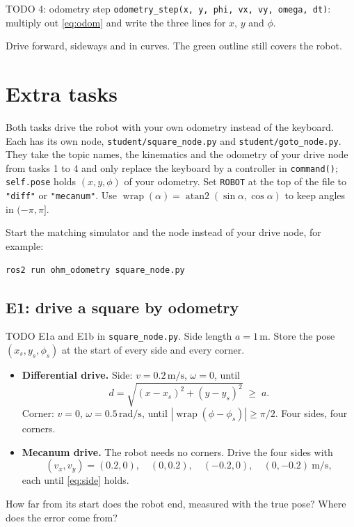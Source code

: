 \documentclass[11pt,a4paper,parskip=half]{scrartcl}
\newcommand{\thema}[1]{\texttt{#1}}
\newcommand{\datei}[1]{\texttt{#1}}
\begin{document}
\begin{todo}{TODO 4: odometry step}
\thema{odometry\_step(x, y, phi, vx, vy, omega, dt)}: multiply out \cref{eq:odom} and write the three
lines for \(x\), \(y\) and \(\phi\).
\end{todo}

\begin{checkpoint}
Drive forward, sideways and in curves. The green outline still covers the robot.
\end{checkpoint}

\newpage
\section{Extra tasks}
\label{sec:extra}
Both tasks drive the robot with your own odometry instead of the keyboard. Each has its own node,
\datei{student/square\_node.py} and \datei{student/goto\_node.py}. They take the topic names, the
kinematics and the odometry of your drive node from tasks 1 to 4 and only replace the keyboard by a controller in \thema{command()};
\thema{self.pose} holds \((x, y, \phi)\) of your odometry. Set \thema{ROBOT} at the top of the file to
\thema{"diff"} or \thema{"mecanum"}. Use \(\operatorname{wrap}(\alpha) = \operatorname{atan2}(\sin\alpha,
\cos\alpha)\) to keep angles in \((-\pi, \pi]\).

Start the matching simulator and the node instead of your drive node, for example:
\begin{lstlisting}
ros2 run ohm_odometry square_node.py
\end{lstlisting}

\subsection*{E1: drive a square by odometry}
TODO E1a and E1b in \datei{square\_node.py}. Side length \(a = 1\,\mathrm{m}\). Store the pose \((x_s, y_s, \phi_s)\) at the start of every side
and every corner.
\begin{itemize}
  \item \textbf{Differential drive.} Side: \(v = 0.2\,\mathrm{m/s}\), \(\omega = 0\), until
        \begin{equation}
          d = \sqrt{(x - x_s)^2 + (y - y_s)^2} \;\ge\; a .
          \label{eq:side}
        \end{equation}
        Corner: \(v = 0\), \(\omega = 0.5\,\mathrm{rad/s}\), until
        \(\left|\operatorname{wrap}(\phi - \phi_s)\right| \ge \pi/2\). Four sides, four corners.
  \item \textbf{Mecanum drive.} The robot needs no corners. Drive the four sides with
        \begin{equation*}
          (v_x, v_y) = (0.2, 0),\quad (0, 0.2),\quad (-0.2, 0),\quad (0, -0.2)\ \mathrm{m/s},
        \end{equation*}
        each until \cref{eq:side} holds.
\end{itemize}
How far from its start does the robot end, measured with the true pose? Where does the error come from?
\end{document}
